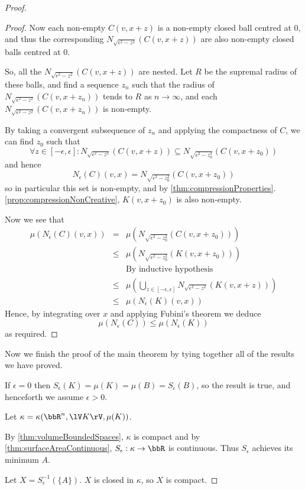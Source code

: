 \documentclass[a4paper,11pt]{article}
\begin{document}
\begin{proof}
\begin{proof}
Now each non-empty $C(v,x+z)$ is a non-empty closed
ball centred at $0$, and thus the corresponding
$N_{\sqrt{\epsilon^2-z^2}}(C(v,x+z))$ are also
non-empty closed balls centred at $0$.

So, all the $N_{\sqrt{\epsilon^2-z^2}}(C(v,x+z))$ are nested.  Let $R$ be the
supremal radius of these balls, and find a sequence
$z_n$ such that the radius of $N_{\sqrt{\epsilon^2-z^2}}(C(v,x+z_n))$ tends to
$R$ as $n\to\infty$, and each $N_{\sqrt{\epsilon^2-z^2}}(C(v,x+z_n))$ is
non-empty.

By taking a convergent subsequence of $z_n$ and applying the compactness of
$C$, we can find $z_0$ such that
\[
\forall z\in[-\epsilon,\epsilon]:N_{\sqrt{\epsilon^2-z^2}}(C(v,x+z))\subseteq
	N_{\sqrt{\epsilon^2-z_0^2}}(C(v,x+z_0))
\]
and hence
\[
N_\epsilon(C)(v,x)=N_{\sqrt{\epsilon^2-z_0^2}}(C(v,x+z_0))
\]
so in particular this set is non-empty, and by
\ref{thm:compressionProperties}.\ref{prop:compressionNonCreative}, $K(v,x+z_0)$
is also non-empty.

Now we see that
%
\begin{eqnarray*}
\mu(N_\epsilon(C)(v,x))
&=& \mu\left(N_{\sqrt{\epsilon^2-z_0^2}}(C(v,x+z_0))\right) \\
&\leq& \mu\left(N_{\sqrt{\epsilon^2-z_0^2}}(K(v,x+z_0))\right) \\
&& \textrm{By inductive hypothesis} \\
&\leq& \mu\left(\bigcup_{z\in[-\epsilon,\epsilon]}
	N_{\sqrt{\epsilon^2-z^2}}(K(v,x+z))\right) \\
&\leq& \mu(N_\epsilon(K)(v,x))
\end{eqnarray*}
%
Hence, by integrating over $x$ and applying Fubini's theorem we deduce
\[
\mu(N_\epsilon(C))\leq\mu(N_\epsilon(K))
\]
as required.
\end{proof}

Now we finish the proof of the main theorem by tying together all of the
results we have proved.

If $\epsilon=0$ then $S_\epsilon(K)=\mu(K)=\mu(B)=S_\epsilon(B)$, so the result
is true, and henceforth we assume $\epsilon>0$.

Let $\kappa=\kappa(\bbR^n,\lV K\rV,\mu(K))$.

By \ref{thm:volumeBoundedSpaces}, $\kappa$ is compact and by
\ref{thm:surfaceAreaContinuous}, $S_\epsilon:\kappa\to\bbR$ is continuous.
Thus $S_\epsilon$ achieves its minimum $A$.

Let $X=S_\epsilon^{-1}(\{A\})$.  $X$ is closed in $\kappa$, so $X$ is compact.


\end{proof}
\end{document}
